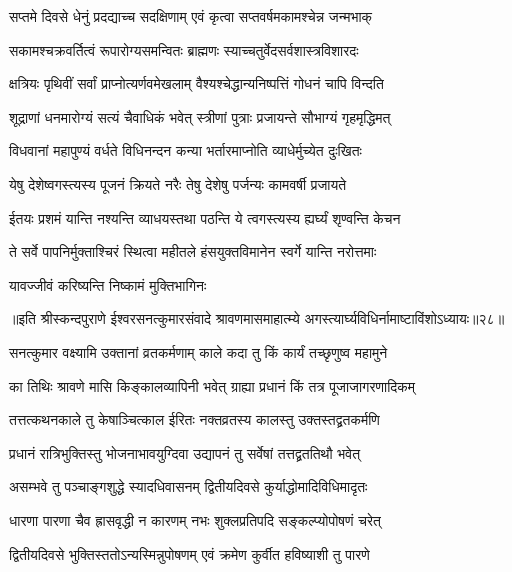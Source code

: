 \twolineshloka
{सप्तमे दिवसे धेनुं प्रदद्याच्च सदक्षिणाम्}
{एवं कृत्वा सप्तवर्षमकामश्चेन्न जन्मभाक्} %

\twolineshloka
{सकामश्चक्रवर्तित्वं रूपारोग्यसमन्वितः}
{ब्राह्मणः स्याच्चतुर्वेदसर्वशास्त्रविशारदः} %

\twolineshloka
{क्षत्रियः पृथिवीं सर्वां प्राप्नोत्यर्णवमेखलाम्}
{वैश्यश्चेद्धान्यनिष्पत्तिं गोधनं चापि विन्दति} %

\twolineshloka
{शूद्राणां धनमारोग्यं सत्यं चैवाधिकं भवेत्}
{स्त्रीणां पुत्राः प्रजायन्ते सौभाग्यं गृहमृद्धिमत्} %

\twolineshloka
{विधवानां महापुण्यं वर्धते विधिनन्दन}
{कन्या भर्तारमाप्नोति व्याधेर्मुच्येत दुःखितः} %

\twolineshloka
{येषु देशेष्वगस्त्यस्य पूजनं क्रियते नरैः}
{तेषु देशेषु पर्जन्यः कामवर्षी प्रजायते} %

\twolineshloka
{ईतयः प्रशमं यान्ति नश्यन्ति व्याधयस्तथा}
{पठन्ति ये त्वगस्त्यस्य ह्यर्घ्यं शृण्वन्ति केचन} %

\twolineshloka
{ते सर्वे पापनिर्मुक्ताश्चिरं स्थित्वा महीतले}
{हंसयुक्तविमानेन स्वर्गे यान्ति नरोत्तमाः} %

\onelineshloka
{यावज्जीवं करिष्यन्ति निष्कामं मुक्तिभागिनः} %


{॥इति श्रीस्कन्दपुराणे ईश्वरसनत्कुमारसंवादे श्रावणमासमाहात्म्ये अगस्त्यार्घ्यविधिर्नामाष्टाविंशोऽध्यायः॥२८॥}





\twolineshloka
{सनत्कुमार वक्ष्यामि उक्तानां व्रतकर्मणाम्}
{काले कदा तु किं कार्यं तच्छृणुष्व महामुने} %

\twolineshloka
{का तिथिः श्रावणे मासि किङ्कालव्यापिनी भवेत्}
{ग्राह्या प्रधानं किं तत्र पूजाजागरणादिकम्} %

\twolineshloka
{तत्तत्कथनकाले तु केषाञ्चित्काल ईरितः}
{नक्तव्रतस्य कालस्तु उक्तस्तद्व्रतकर्मणि} %

\twolineshloka
{प्रधानं रात्रिभुक्तिस्तु भोजनाभावयुग्दिवा}
{उद्यापनं तु सर्वेषां तत्तद्व्रततिथौ भवेत्} %

\twolineshloka
{असम्भवे तु पञ्चाङ्गशुद्धे स्यादधिवासनम्}
{द्वितीयदिवसे कुर्याद्धोमादिविधिमादृतः} %

\twolineshloka
{धारणा पारणा चैव ह्रासवृद्धी न कारणम्}
{नभः शुक्लप्रतिपदि सङ्कल्प्योपोषणं चरेत्} %

\twolineshloka
{द्वितीयदिवसे भुक्तिस्ततोऽन्यस्मिन्नुपोषणम्}
{एवं क्रमेण कुर्वीत हविष्याशी तु पारणे} %

